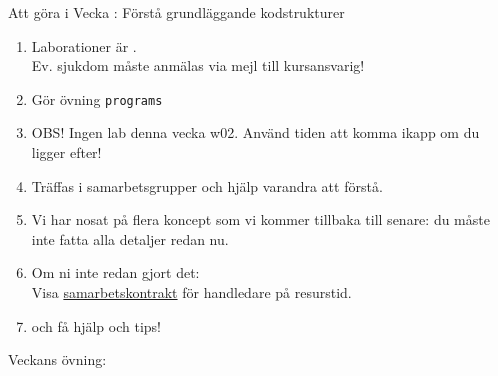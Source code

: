 \begin{Slide}{Att göra i Vecka \vecka: Förstå grundläggande kodstrukturer}

\begin{enumerate}
\item Laborationer är .\\ Ev. sjukdom måste anmälas  via mejl till kursansvarig!
\item Gör övning \texttt{programs}
\item OBS! Ingen lab denna vecka w02. Använd tiden att komma ikapp om du ligger efter!
\item Träffas i samarbetsgrupper och hjälp varandra att förstå.
\item Vi har nosat på flera koncept som vi kommer tillbaka till senare: du måste inte fatta alla detaljer redan nu.
\item Om ni inte redan gjort det: \\Visa \href{https://github.com/bjornregnell/lth-eda016-2015/tree/master/assignments}{samarbetskontrakt} för handledare på resurstid.
\item {} och få hjälp och tips! 
\end{enumerate}
\end{Slide}

\begin{Slide}{Veckans övning: }\SlideFontTiny
\vspace{-0.5em}
\setlength{\leftmargini}{0pt}
\begin{itemize}

\end{itemize}
\end{Slide}











